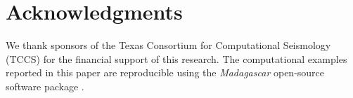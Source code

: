 \section{Acknowledgments}
We thank sponsors of the Texas Consortium for Computational Seismology (TCCS) for the financial support of this research.
The computational examples reported in this paper are reproducible using the \textit{Madagascar} open-source software package \cite[]{reprod}.

\onecolumn



